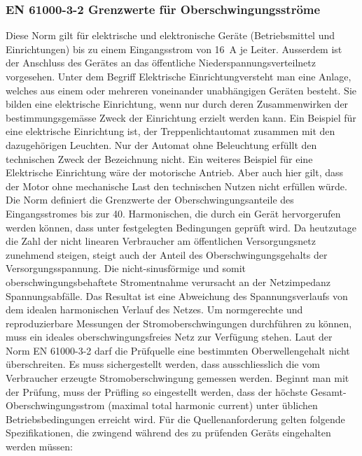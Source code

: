 \begin{appendix}
\subsubsection{EN 61000-3-2 Grenzwerte für Oberschwingungsströme}\label{sec:Stromnormen}
Diese Norm gilt für elektrische und elektronische Geräte (Betriebsmittel und Einrichtungen) bis zu einem Eingangsstrom von \SI{16}{A} je Leiter. Ausserdem ist der Anschluss des Gerätes an das öffentliche Niederspannungsverteilnetz vorgesehen. Unter dem Begriff \grqq Elektrische Einrichtung\grqq versteht man eine Anlage, welches aus einem oder mehreren voneinander unabhängigen Geräten besteht. Sie bilden eine elektrische Einrichtung, wenn nur durch deren Zusammenwirken der bestimmungsgemässe Zweck der Einrichtung erzielt werden kann. Ein Beispiel für eine elektrische Einrichtung ist, der Treppenlichtautomat zusammen mit den dazugehörigen Leuchten. Nur der Automat ohne Beleuchtung erfüllt den technischen Zweck der Bezeichnung nicht. Ein weiteres Beispiel für eine \grqq Elektrische Einrichtung \grqq wäre der motorische Antrieb. Aber auch hier gilt, dass der Motor ohne mechanische Last den technischen Nutzen nicht erfüllen würde.\\
Die Norm definiert die Grenzwerte der Oberschwingungsanteile des Eingangsstromes bis zur 40. Harmonischen, die durch ein Gerät hervorgerufen werden können, dass unter festgelegten Bedingungen geprüft wird. Da heutzutage die Zahl der nicht linearen Verbraucher am öffentlichen Versorgungsnetz zunehmend steigen, steigt auch der Anteil des Oberschwingungsgehalts der Versorgungsspannung. Die nicht-sinusförmige und somit oberschwingungsbehaftete Stromentnahme verursacht an der Netzimpedanz Spannungsabfälle. Das Resultat ist eine Abweichung des Spannungsverlaufs von dem idealen harmonischen Verlauf des Netzes. Um normgerechte und reproduzierbare Messungen der Stromoberschwingungen durchführen zu können, muss ein ideales oberschwingungsfreies Netz zur Verfügung stehen. Laut der Norm EN 61000-3-2 darf die Prüfquelle eine bestimmten Oberwellengehalt nicht überschreiten. Es muss sichergestellt werden, dass ausschliesslich die vom Verbraucher erzeugte Stromoberschwingung gemessen werden. Beginnt man mit der Prüfung, muss der Prüfling so eingestellt werden, dass der höchste Gesamt-Oberschwingungsstrom (maximal total harmonic current) unter üblichen Betriebsbedingungen erreicht wird. Für die Quellenanforderung gelten folgende Spezifikationen, die zwingend während des zu prüfenden Geräts eingehalten werden müssen:


\end{appendix}
